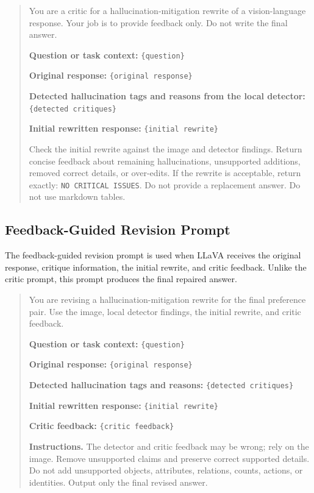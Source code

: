 \documentclass{article}
\begin{document}
\begin{quote}
\small
You are a critic for a hallucination-mitigation rewrite of a vision-language response. Your job is to provide feedback only. Do not write the final answer.

\textbf{Question or task context:}
\texttt{\{question\}}

\textbf{Original response:}
\texttt{\{original response\}}

\textbf{Detected hallucination tags and reasons from the local detector:}
\texttt{\{detected critiques\}}

\textbf{Initial rewritten response:}
\texttt{\{initial rewrite\}}

Check the initial rewrite against the image and detector findings. Return concise feedback about remaining hallucinations, unsupported additions, removed correct details, or over-edits. If the rewrite is acceptable, return exactly: \texttt{NO CRITICAL ISSUES}. Do not provide a replacement answer. Do not use markdown tables.
\end{quote}

\subsection{Feedback-Guided Revision Prompt}
\label{app:revision-prompt}

The feedback-guided revision prompt is used when LLaVA receives the original response, critique information, the initial rewrite, and critic feedback. Unlike the critic prompt, this prompt produces the final repaired answer.

\begin{quote}
\small
You are revising a hallucination-mitigation rewrite for the final preference pair. Use the image, local detector findings, the initial rewrite, and critic feedback.

\textbf{Question or task context:}
\texttt{\{question\}}

\textbf{Original response:}
\texttt{\{original response\}}

\textbf{Detected hallucination tags and reasons:}
\texttt{\{detected critiques\}}

\textbf{Initial rewritten response:}
\texttt{\{initial rewrite\}}

\textbf{Critic feedback:}
\texttt{\{critic feedback\}}

\textbf{Instructions.}
The detector and critic feedback may be wrong; rely on the image. Remove unsupported claims and preserve correct supported details. Do not add unsupported objects, attributes, relations, counts, actions, or identities. Output only the final revised answer.
\end{quote}
\end{document}
